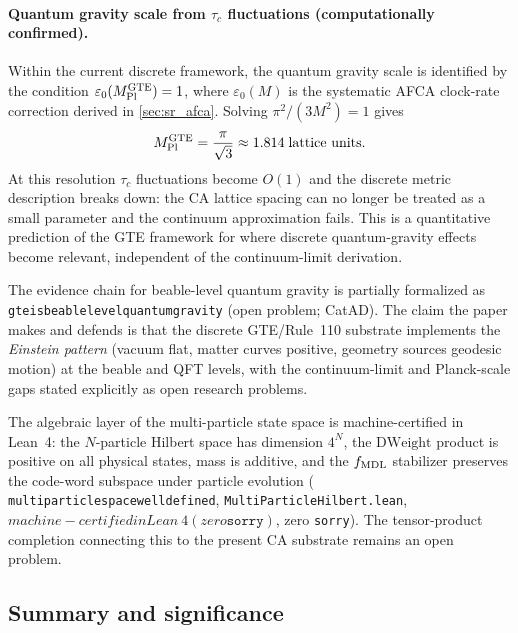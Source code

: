 \documentclass[11pt]{article}
\theoremstyle{remark}
\newcommand{\lean}[1]{%
  \penalty-100
  \begingroup\def\_{\textunderscore\allowbreak}\texttt{#1}\endgroup}
\newcommand{\CatA}{computationally confirmed}
\newcommand{\CatAL}{machine-certified in Lean~4 (zero \texttt{sorry})}
\begin{document}
\paragraph{Quantum gravity scale from $\tau_c$ fluctuations (\CatA).}
Within the current discrete framework, the quantum gravity scale is identified
by the condition $\varepsilon_0(M_{\rm Pl}^{\rm GTE}) = 1$, where $\varepsilon_0(M)$
is the systematic AFCA clock-rate correction derived in \cref{sec:sr_afca}.
Solving $\pi^2/(3M^2) = 1$ gives
\begin{equation}
  M_{\rm Pl}^{\rm GTE} = \frac{\pi}{\sqrt{3}} \approx 1.814 \;\text{lattice units.}
  \label{eq:mpl_gte}
\end{equation}
At this resolution $\tau_c$ fluctuations become $O(1)$ and the discrete metric
description breaks down: the CA lattice spacing can no longer be treated as a
small parameter and the continuum approximation fails.
This is a quantitative prediction of the GTE framework for where discrete
quantum-gravity effects become relevant, independent of the continuum-limit
derivation.

The evidence chain for beable-level quantum gravity is partially formalized as
\lean{gte\_is\_beable\_level\_quantum\_gravity} (open problem; CatAD).
The claim the paper makes and defends is that
the discrete GTE/Rule~110 substrate implements the \emph{Einstein pattern}
(vacuum flat, matter curves positive, geometry sources geodesic motion)
at the beable and QFT levels, with the continuum-limit and Planck-scale
gaps stated explicitly as open research problems.

The algebraic layer of the multi-particle state space is machine-certified in Lean~4:
the $N$-particle Hilbert space has dimension $4^N$, the $\mathrm{DWeight}$ product
is positive on all physical states, mass is additive, and the $f_{\rm MDL}$ stabilizer
preserves the code-word subspace under particle evolution
(\lean{multiparticle\_space\_well\_defined}, \texttt{MultiParticleHilbert.lean}, $\CatAL$, zero
\texttt{sorry}).
The tensor-product completion connecting this to the present CA substrate remains an open
problem.

\subsection{Summary and significance}
\label{ssec:summary}
\end{document}
